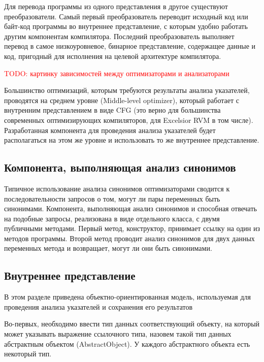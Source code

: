 \documentclass[14pt,titlepage]{extarticle}
\newcommand{\todo}[1]{\textcolor{red}{TODO: #1}}
\newcommand{\eng}[1]{{\English#1}}
\begin{document}
      Для перевода программы из одного представления в другое существуют
      преобразователи.
      Самый первый преобразователь переводит исходный код или байт-код
      программы во внутреннее представление, с которым удобно работать другим
      компонентам компилятора.
      Последний преобразователь выполняет перевод в самое низкоуровневое,
      бинарное представление, содержащее данные и код, пригодный для исполнения
      на целевой архитектуре компилятора.

      \todo{картинку зависимостей между оптимизаторами и анализаторами}

      Большинство оптимизаций, которым требуются результаты анализа указателей,
      проводятся на среднем уровне (\eng{Middle-level optimizer}), который
      работает с внутренним представлением в виде CFG (это верно для
      большинства современных оптимизирующих компиляторов, для Excelsior RVM в
      том числе). Разработанная компонента для проведения анализа указателей
      будет располагаться на этом же уровне и использовать то же внутреннее
      представление.

    \subsection{Компонента, выполняющая анализ синонимов}
      \label{section:analysis_component}

      Типичное использование анализа синонимов оптимизаторами сводится к
      последовательности запросов о том, могут ли пары переменных быть
      синонимами.
      Компонента, выполняющая анализ синонимов и способная отвечать на подобные
      запросы, реализована в виде отдельного класса, с двумя публичными
      методами.
      Первый метод, конструктор, принимает ссылку на один из методов программы.
      Второй метод проводит анализ синонимов для двух данных переменных метода
      и возвращает, могут ли они быть синонимами.

    \subsection{Внутреннее представление}

      В этом разделе приведена объектно-ориентированная модель, используемая
      для проведения анализа указателей и сохранения его результатов

      Во-первых, необходимо ввести тип данных соответствующий объекту, на
      который может указывать выражение ссылочного типа, назовем такой тип
      данных абстрактным объектом (\eng{AbstractObject}). У каждого
      абстрактного объекта есть некоторый тип.
\end{document}
